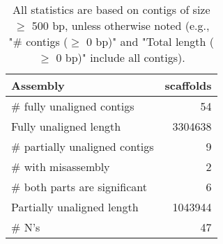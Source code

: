 \documentclass[12pt,a4paper]{article}
\begin{document}
\begin{table}[ht]
\begin{center}
\caption{All statistics are based on contigs of size $\geq$ 500 bp, unless otherwise noted (e.g., "\# contigs ($\geq$ 0 bp)" and "Total length ($\geq$ 0 bp)" include all contigs).}
\begin{tabular}{|l*{1}{|r}|}
\hline
Assembly & scaffolds \\ \hline
\# fully unaligned contigs & 54 \\ \hline
Fully unaligned length & 3304638 \\ \hline
\# partially unaligned contigs & 9 \\ \hline
\hspace{5mm}\# with misassembly & 2 \\ \hline
\hspace{5mm}\# both parts are significant & 6 \\ \hline
Partially unaligned length & 1043944 \\ \hline
\# N's & 47 \\ \hline
\end{tabular}
\end{center}
\end{table}
\end{document}

